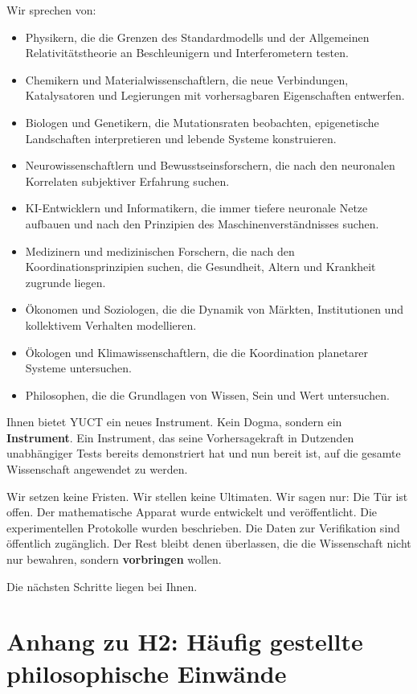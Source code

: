 \documentclass[12pt,a4paper]{article}
\begin{document}
Wir sprechen von:
\begin{itemize}
	\item Physikern, die die Grenzen des Standardmodells und der Allgemeinen Relativitätstheorie an Beschleunigern und Interferometern testen.
	\item Chemikern und Materialwissenschaftlern, die neue Verbindungen, Katalysatoren und Legierungen mit vorhersagbaren Eigenschaften entwerfen.
	\item Biologen und Genetikern, die Mutationsraten beobachten, epigenetische Landschaften interpretieren und lebende Systeme konstruieren.
	\item Neurowissenschaftlern und Bewusstseinsforschern, die nach den neuronalen Korrelaten subjektiver Erfahrung suchen.
	\item KI-Entwicklern und Informatikern, die immer tiefere neuronale Netze aufbauen und nach den Prinzipien des Maschinenverständnisses suchen.
	\item Medizinern und medizinischen Forschern, die nach den Koordinationsprinzipien suchen, die Gesundheit, Altern und Krankheit zugrunde liegen.
	\item Ökonomen und Soziologen, die die Dynamik von Märkten, Institutionen und kollektivem Verhalten modellieren.
	\item Ökologen und Klimawissenschaftlern, die die Koordination planetarer Systeme untersuchen.
	\item Philosophen, die die Grundlagen von Wissen, Sein und Wert untersuchen.
\end{itemize}

Ihnen bietet YUCT ein neues Instrument. Kein Dogma, sondern ein \textbf{Instrument}. Ein Instrument, das seine Vorhersagekraft in Dutzenden unabhängiger Tests bereits demonstriert hat und nun bereit ist, auf die gesamte Wissenschaft angewendet zu werden.

Wir setzen keine Fristen. Wir stellen keine Ultimaten. Wir sagen nur: Die Tür ist offen. Der mathematische Apparat wurde entwickelt und veröffentlicht. Die experimentellen Protokolle wurden beschrieben. Die Daten zur Verifikation sind öffentlich zugänglich. Der Rest bleibt denen überlassen, die die Wissenschaft nicht nur bewahren, sondern \textbf{vorbringen} wollen.

Die nächsten Schritte liegen bei Ihnen.

\section*{Anhang zu H2: Häufig gestellte philosophische Einwände}
\end{document}
